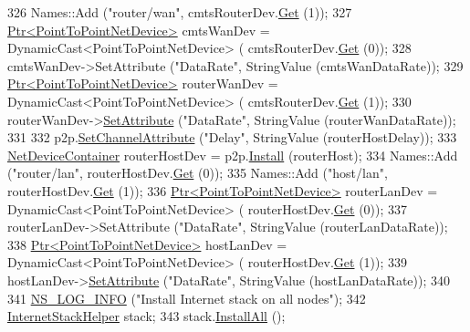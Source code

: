 \begin{DoxyCode}
326   Names::Add (\textcolor{stringliteral}{"router/wan"}, cmtsRouterDev.\hyperlink{classns3_1_1NetDeviceContainer_a677d62594b5c9d2dea155cc5045f4d0b}{Get} (1));
327   \hyperlink{classns3_1_1Ptr}{Ptr<PointToPointNetDevice>} cmtsWanDev = DynamicCast<PointToPointNetDevice> (
      cmtsRouterDev.\hyperlink{classns3_1_1NetDeviceContainer_a677d62594b5c9d2dea155cc5045f4d0b}{Get} (0));
328   cmtsWanDev->SetAttribute (\textcolor{stringliteral}{"DataRate"}, StringValue (cmtsWanDataRate));
329   \hyperlink{classns3_1_1Ptr}{Ptr<PointToPointNetDevice>} routerWanDev = DynamicCast<PointToPointNetDevice> (
      cmtsRouterDev.\hyperlink{classns3_1_1NetDeviceContainer_a677d62594b5c9d2dea155cc5045f4d0b}{Get} (1));
330   routerWanDev->\hyperlink{classns3_1_1ObjectBase_ac60245d3ea4123bbc9b1d391f1f6592f}{SetAttribute} (\textcolor{stringliteral}{"DataRate"}, StringValue (routerWanDataRate));
331 
332   p2p.\hyperlink{classns3_1_1PointToPointHelper_a6b5317fd17fb61e5a53f8d66a90b63b9}{SetChannelAttribute} (\textcolor{stringliteral}{"Delay"}, StringValue (routerHostDelay));
333   \hyperlink{classns3_1_1NetDeviceContainer}{NetDeviceContainer} routerHostDev = p2p.\hyperlink{classns3_1_1PointToPointHelper_ab9162fea3e88722666fed1106df1f9ec}{Install} (routerHost);
334   Names::Add (\textcolor{stringliteral}{"router/lan"}, routerHostDev.\hyperlink{classns3_1_1NetDeviceContainer_a677d62594b5c9d2dea155cc5045f4d0b}{Get} (0));
335   Names::Add (\textcolor{stringliteral}{"host/lan"}, routerHostDev.\hyperlink{classns3_1_1NetDeviceContainer_a677d62594b5c9d2dea155cc5045f4d0b}{Get} (1));
336   \hyperlink{classns3_1_1Ptr}{Ptr<PointToPointNetDevice>} routerLanDev = DynamicCast<PointToPointNetDevice> (
      routerHostDev.\hyperlink{classns3_1_1NetDeviceContainer_a677d62594b5c9d2dea155cc5045f4d0b}{Get} (0));
337   routerLanDev->SetAttribute (\textcolor{stringliteral}{"DataRate"}, StringValue (routerLanDataRate));
338   \hyperlink{classns3_1_1Ptr}{Ptr<PointToPointNetDevice>} hostLanDev = DynamicCast<PointToPointNetDevice> (
      routerHostDev.\hyperlink{classns3_1_1NetDeviceContainer_a677d62594b5c9d2dea155cc5045f4d0b}{Get} (1));
339   hostLanDev->\hyperlink{classns3_1_1ObjectBase_ac60245d3ea4123bbc9b1d391f1f6592f}{SetAttribute} (\textcolor{stringliteral}{"DataRate"}, StringValue (hostLanDataRate));
340 
341   \hyperlink{group__logging_gafbd73ee2cf9f26b319f49086d8e860fb}{NS\_LOG\_INFO} (\textcolor{stringliteral}{"Install Internet stack on all nodes"});
342   \hyperlink{classns3_1_1InternetStackHelper}{InternetStackHelper} stack;
343   stack.\hyperlink{classns3_1_1InternetStackHelper_a6cfa73782fd4071c4cfbd73ebf1bbb44}{InstallAll} ();

\end{DoxyCode}
